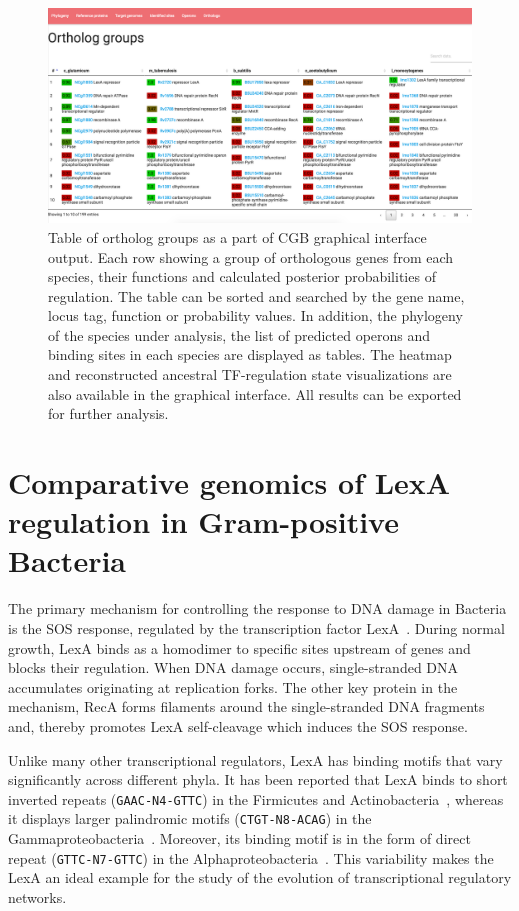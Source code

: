 \documentclass[12pt]{article}
\begin{document}
\begin{figure}
  \centering
  \includegraphics[width=\textwidth]{figures/chapter4/output}
  \caption{Table of ortholog groups as a part of CGB graphical interface
    output. Each row showing a group of orthologous genes from each species,
    their functions and calculated posterior probabilities of regulation. The
    table can be sorted and searched by the gene name, locus tag, function or
    probability values. In addition, the phylogeny of the species under
    analysis, the list of predicted operons and binding sites in each species
    are displayed as tables. The heatmap and reconstructed ancestral
    TF-regulation state visualizations are also available in the graphical
    interface. All results can be exported for further analysis.}
  \label{fig:gui-output}
\end{figure}

\section{Comparative genomics of LexA regulation in Gram-positive Bacteria}

The primary mechanism for controlling the response to DNA damage in Bacteria is
the SOS response, regulated by the transcription factor
LexA~\cite{radman1975sos, erill2007aeons, michel2005after}. During normal
growth, LexA binds as a homodimer to specific sites upstream of genes and
blocks their regulation. When DNA damage occurs, single-stranded DNA
accumulates originating at replication forks. The other key protein in the
mechanism, RecA forms filaments around the single-stranded DNA fragments and,
thereby promotes LexA self-cleavage which induces the SOS response.

Unlike many other transcriptional regulators, LexA has binding motifs that vary
significantly across different phyla. It has been reported that LexA binds to
short inverted repeats (\texttt{GAAC-N4-GTTC}) in the Firmicutes and
Actinobacteria~\cite{au2005genetic, davis2002definition}, whereas it displays
larger palindromic motifs (\texttt{CTGT-N8-ACAG}) in the
Gammaproteobacteria~\cite{erill2003silico,
  fernandez2000identification}. Moreover, its binding motif is in the form of
direct repeat (\texttt{GTTC-N7-GTTC}) in the
Alphaproteobacteria~\cite{erill2004differences, fernandez1998identification}.
This variability makes the LexA an ideal example for the study of the evolution
of transcriptional regulatory networks.
\end{document}

